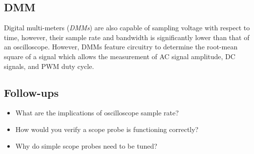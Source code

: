 \documentclass[main.tex]{subfiles}
\begin{document}

\subsection{DMM}
Digital multi-meters (\textit{DMMs}) are also capable of sampling voltage with respect to time, however, their sample rate and bandwidth is significantly lower than that of an oscilloscope. However, DMMs feature circuitry to determine the root-mean square of a signal which allows the measurement of AC signal amplitude, DC signals, and PWM duty cycle.

\subsection{Follow-ups}
\begin{itemize}  
    \item What are the implications of oscilloscope sample rate?
    \item How would you verify a scope probe is functioning correctly?
    \item Why do simple scope probes need to be tuned?
\end{itemize}
\end{document}
